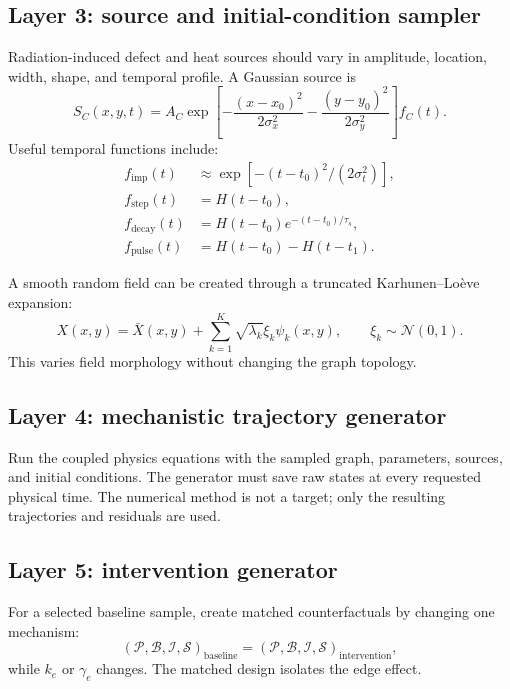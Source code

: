 \documentclass[11pt]{article}
\begin{document}
\subsection{Layer 3: source and initial-condition sampler}

Radiation-induced defect and heat sources should vary in amplitude, location, width, shape, and temporal profile. A Gaussian source is
\begin{equation}
S_C(x,y,t)=A_C
\exp\left[-\frac{(x-x_0)^2}{2\sigma_x^2}-\frac{(y-y_0)^2}{2\sigma_y^2}\right]f_C(t).
\label{eq:gaussian_defect_source}
\end{equation}
Useful temporal functions include:
\begin{align}
f_{\mathrm{imp}}(t)&\approx \exp[-(t-t_0)^2/(2\sigma_t^2)],\\
f_{\mathrm{step}}(t)&=H(t-t_0),\\
f_{\mathrm{decay}}(t)&=H(t-t_0)e^{-(t-t_0)/\tau_s},\\
f_{\mathrm{pulse}}(t)&=H(t-t_0)-H(t-t_1).
\end{align}

A smooth random field can be created through a truncated Karhunen--Lo\`eve expansion:
\begin{equation}
X(x,y)=\bar{X}(x,y)+\sum_{k=1}^{K}\sqrt{\lambda_k}\xi_k\psi_k(x,y),
\qquad \xi_k\sim\mathcal{N}(0,1).
\label{eq:kl_random_field}
\end{equation}
This varies field morphology without changing the graph topology.

\subsection{Layer 4: mechanistic trajectory generator}

Run the coupled physics equations with the sampled graph, parameters, sources, and initial conditions. The generator must save raw states at every requested physical time. The numerical method is not a target; only the resulting trajectories and residuals are used.

\subsection{Layer 5: intervention generator}

For a selected baseline sample, create matched counterfactuals by changing one mechanism:
\begin{equation}
\left(\mathcal{P},\mathcal{B},\mathcal{I},\mathcal{S}\right)_{\mathrm{baseline}}
=
\left(\mathcal{P},\mathcal{B},\mathcal{I},\mathcal{S}\right)_{\mathrm{intervention}},
\end{equation}
while \(k_e\) or \(\gamma_e\) changes. The matched design isolates the edge effect.
\end{document}
